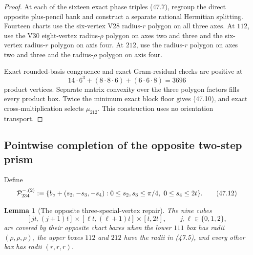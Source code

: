 \documentclass[11pt,oneside]{article}
\newtheorem{lemma}[theorem]{Lemma}
\theoremstyle{definition}
\theoremstyle{remark}
\begin{document}
\begin{proof}
At each of the sixteen exact phase triples (47.7), regroup the
direct opposite plus-pencil bank and construct a separate rational
Hermitian splitting.  Fourteen charts use the six-vertex V28
radius-\(r\) polygon on all three axes.  At \(112\), use the V30
eight-vertex radius-\(\rho\) polygon on axes two and three and the
six-vertex radius-\(r\) polygon on axis four.  At \(212\), use the
radius-\(r\) polygon on axes two and three and the
radius-\(\rho\) polygon on axis four.

Exact rounded-basis congruence and exact Gram-residual checks are
positive at
\[
 14\cdot6^3+(8\cdot8\cdot6)+(6\cdot6\cdot8)
 =3696                                                 \tag{47.11}
\]
product vertices.  Separate matrix convexity over the three
polygon factors fills every product box.  Twice the minimum exact
block floor gives (47.10), and exact cross-multiplication selects
\(\mu_{212}\).  This construction uses no orientation transport.
\end{proof}

\subsection{Pointwise completion of the opposite two-step prism}

Define
\[
 {\cal P}_{234}^{-,(2)}:=
 \{b_\circ+(s_2,-s_3,-s_4):
 0\le s_2,s_3\le\pi/4,\ 0\le s_4\le2t\}.              \tag{47.12}
\]

\begin{lemma}[The opposite three-special-vertex repair]
\label{lem:newv47-special-cover}
The nine cubes
\[
 [jt,(j+1)t]\times[\ell t,(\ell+1)t]\times[t,2t],
 \qquad j,\ell\in\{0,1,2\},                            \tag{47.13}
\]
are covered by their opposite chart boxes when the lower \(111\)
box has radii \((\rho,\rho,\rho)\), the upper boxes \(112\) and
\(212\) have the radii in (47.5), and every other box has radii
\((r,r,r)\).
\end{lemma}
\end{document}

